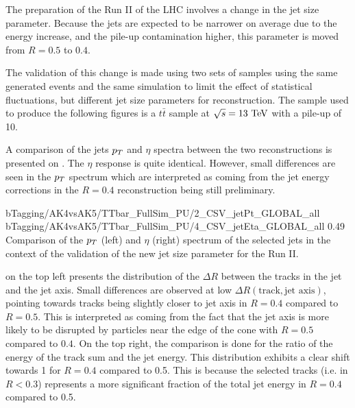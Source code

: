     The preparation of the Run II of the LHC involves a change in the jet size
    parameter.  Because the jets are expected to be narrower on average due to
    the energy increase, and the pile-up contamination higher, this parameter is
    moved from $R = 0.5$ to $0.4$.

    The validation of this change is made using two sets of samples using the
    same generated events and the same simulation to limit the effect of
    statistical fluctuations, but different jet size parameters for
    reconstruction. The sample used to produce the following figures is a
    $t\bar{t}$ sample at $\sqrt{s} = 13~\text{TeV}$ with a pile-up of 10.

    A comparison of the jets $p_T$ and $\eta$ spectra between the two
    reconstructions is presented on
    . The $\eta$
    response is quite identical. However, small differences are seen in the
    $p_T$ spectrum which are interpreted as coming from the jet energy
    corrections in the $R = 0.4$ reconstruction being still preliminary.

                     {bTagging/AK4vsAK5/TTbar_FullSim_PU/2_CSV_jetPt_GLOBAL_all}
                     {bTagging/AK4vsAK5/TTbar_FullSim_PU/4_CSV_jetEta_GLOBAL_all}
                     {0.49}
                     {Comparison of the $p_T$ (left) and $\eta$ (right) spectrum of
                     the selected jets in the context of the validation of the new
                     jet size parameter for the Run II.}

     on the top
    left presents the distribution of the $\Delta R$ between the tracks in the
    jet and the jet axis. Small differences are observed at low $\Delta
    R(\text{track},\text{jet axis})$, pointing towards tracks being slightly
    closer to jet axis in $R = 0.4$ compared to $R = 0.5$. This is interpreted
    as coming from the fact that the jet axis is more likely to be disrupted by
    particles near the edge of the cone with $R = 0.5$ compared to $0.4$.  On
    the top right, the comparison is done for the ratio of the energy of the
    track sum and the jet energy. This distribution exhibits a clear shift
    towards 1 for $R = 0.4$ compared to 0.5. This is because the selected tracks
    (i.e. in $R < 0.3$) represents a more significant fraction of the total jet
    energy in $R = 0.4$ compared to 0.5.


